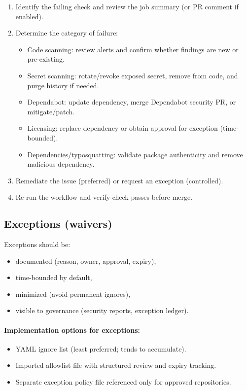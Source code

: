 \documentclass[11pt]{article}
\begin{document}
\begin{enumerate}[leftmargin=*]
  \item Identify the failing check and review the job summary (or PR comment if enabled).
  \item Determine the category of failure:
    \begin{itemize}
      \item Code scanning: review alerts and confirm whether findings are new or pre-existing.
      \item Secret scanning: rotate/revoke exposed secret, remove from code, and purge history if needed.
      \item Dependabot: update dependency, merge Dependabot security PR, or mitigate/patch.
      \item Licensing: replace dependency or obtain approval for exception (time-bounded).
      \item Dependencies/typosquatting: validate package authenticity and remove malicious dependency.
    \end{itemize}
  \item Remediate the issue (preferred) or request an exception (controlled).
  \item Re-run the workflow and verify check passes before merge.
\end{enumerate}

\subsection{Exceptions (waivers)}

Exceptions should be:
\begin{itemize}[leftmargin=*]
  \item documented (reason, owner, approval, expiry),
  \item time-bounded by default,
  \item minimized (avoid permanent ignores),
  \item visible to governance (security reports, exception ledger).
\end{itemize}

\paragraph{Implementation options for exceptions:}
\begin{itemize}[leftmargin=*]
  \item YAML ignore list (least preferred; tends to accumulate).
  \item Imported allowlist file with structured review and expiry tracking.
  \item Separate exception policy file referenced only for approved repositories.
\end{itemize}
\end{document}
